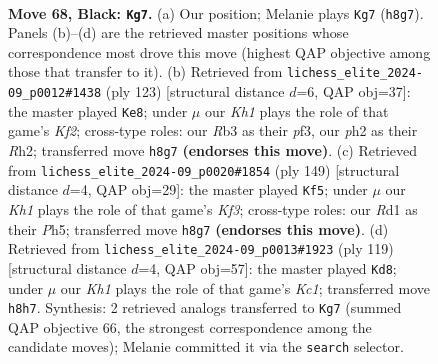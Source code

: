 \documentclass[11pt]{article}
\begin{document}
\clearpage

\begin{figure}[p]\centering
\begin{subfigure}{0.46\textwidth}\centering
\resizebox{\linewidth}{!}{%
\newchessgame
\chessboard[
  setfen={R6k/8/8/8/5K2/1r6/7P/3r4 b - - 4 68},
  showmover=false,
  pgfstyle=straightmove, color=movearrow, markmove={h8-g7}
]}
\caption{}
\end{subfigure}\hfill
\begin{subfigure}{0.46\textwidth}\centering
\resizebox{\linewidth}{!}{%
\newchessgame
\chessboard[
  setfen={8/1R3k2/8/5K2/8/5P2/7r/8 b - - 4 62},
  showmover=false,
  pgfstyle=straightmove, color=movearrow, markmove={f7-e8}
]}
\caption{}
\end{subfigure}
\\[4pt]
\begin{subfigure}{0.46\textwidth}\centering
\resizebox{\linewidth}{!}{%
\newchessgame
\chessboard[
  setfen={8/8/2R2k2/7p/r7/6P1/8/6K1 b - - 37 75},
  showmover=false,
  pgfstyle=straightmove, color=movearrow, markmove={f6-f5}
]}
\caption{}
\end{subfigure}\hfill
\begin{subfigure}{0.46\textwidth}\centering
\resizebox{\linewidth}{!}{%
\newchessgame
\chessboard[
  setfen={2k5/6r1/1K1P4/8/8/8/2R5/8 b - - 10 60},
  showmover=false,
  pgfstyle=straightmove, color=movearrow, markmove={c8-d8}
]}
\caption{}
\end{subfigure}
\caption{\textbf{Move 68, Black: \texttt{Kg7}.} (a) Our position; Melanie plays \texttt{Kg7} (\texttt{h8g7}). Panels (b)--(d) are the retrieved master positions whose correspondence most drove this move (highest QAP objective among those that transfer to it). (b) Retrieved from \texttt{lichess\_elite\_2024-09\_p0012\#1438} (ply 123) [structural distance $d$=6, QAP obj=37]: the master played \texttt{Ke8}; under $\mu$ our \emph{Kh1} plays the role of that game's \emph{Kf2}; cross-type roles: our \emph{R}b3 as their \emph{p}f3, our \emph{p}h2 as their \emph{R}h2; transferred move \texttt{h8g7} \textbf{(endorses this move)}. (c) Retrieved from \texttt{lichess\_elite\_2024-09\_p0020\#1854} (ply 149) [structural distance $d$=4, QAP obj=29]: the master played \texttt{Kf5}; under $\mu$ our \emph{Kh1} plays the role of that game's \emph{Kf3}; cross-type roles: our \emph{R}d1 as their \emph{P}h5; transferred move \texttt{h8g7} \textbf{(endorses this move)}. (d) Retrieved from \texttt{lichess\_elite\_2024-09\_p0013\#1923} (ply 119) [structural distance $d$=4, QAP obj=57]: the master played \texttt{Kd8}; under $\mu$ our \emph{Kh1} plays the role of that game's \emph{Kc1}; transferred move \texttt{h8h7}. Synthesis: 2 retrieved analogs transferred to \texttt{Kg7} (summed QAP objective 66, the strongest correspondence among the candidate moves); Melanie committed it via the \texttt{search} selector.}
\label{fig:thought-m135}
\end{figure}
\end{document}
